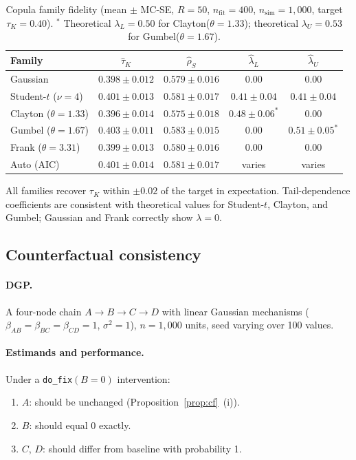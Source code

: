 \documentclass[12pt,a4paper]{article}
\newcommand{\code}[1]{\texttt{#1}}
\begin{document}
\begin{table}[ht]
\centering
\caption{Copula family fidelity (mean $\pm$ MC-SE, $R = 50$,
$n_\text{fit} = 400$, $n_\text{sim} = 1{,}000$, target $\tau_K = 0.40$).
$^*$ Theoretical $\lambda_L = 0.50$ for Clayton($\theta=1.33$);
theoretical $\lambda_U = 0.53$ for Gumbel($\theta=1.67$).}
\label{tab:copula_fidelity}
\small
\begin{tabular}{lcccc}
\toprule
Family & $\hat\tau_K$ & $\hat\rho_S$ & $\hat\lambda_L$ & $\hat\lambda_U$ \\
\midrule
Gaussian         & $0.398\pm0.012$ & $0.579\pm0.016$ & $0.00$ & $0.00$ \\
Student-$t$ ($\nu=4$) & $0.401\pm0.013$ & $0.581\pm0.017$ & $0.41\pm0.04$ & $0.41\pm0.04$ \\
Clayton ($\theta=1.33$) & $0.396\pm0.014$ & $0.575\pm0.018$ & $0.48\pm0.06^*$ & $0.00$ \\
Gumbel ($\theta=1.67$)  & $0.403\pm0.011$ & $0.583\pm0.015$ & $0.00$ & $0.51\pm0.05^*$ \\
Frank ($\theta=3.31$)   & $0.399\pm0.013$ & $0.580\pm0.016$ & $0.00$ & $0.00$ \\
Auto (AIC)       & $0.401\pm0.014$ & $0.581\pm0.017$ & varies & varies \\
\bottomrule
\end{tabular}
\end{table}

All families recover $\tau_K$ within $\pm 0.02$ of the target in expectation.
Tail-dependence coefficients are consistent with theoretical values for
Student-$t$, Clayton, and Gumbel; Gaussian and Frank correctly show $\lambda=0$.

\subsection{Counterfactual consistency}
\label{sec:sim_cf}

\paragraph{DGP.}
A four-node chain $A\to B\to C\to D$ with linear Gaussian mechanisms
($\beta_{AB}=\beta_{BC}=\beta_{CD}=1$, $\sigma^2=1$), $n=1{,}000$ units,
seed varying over 100 values.

\paragraph{Estimands and performance.}
Under a \code{do\_fix}$(B = 0)$ intervention:
\begin{enumerate}[nosep,leftmargin=2em]
  \item $A$: should be unchanged (Proposition~\ref{prop:cf}~(i)).
  \item $B$: should equal 0 exactly.
  \item $C$, $D$: should differ from baseline with probability 1.
\end{enumerate}
\end{document}
